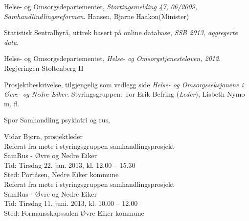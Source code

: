 \documentclass[11pt]{report} %
\begin{document}
              \begin{thebibliography}{99}

                  Helse- og Omsorgsdepartementet,
                  \emph{Stortingsmelding 47, 06/2009, Samhandlindlingsreformen}.
                  Hansen, Bjarne Haakon(Minister)

                  Statistisk Sentralbyrå, uttrek basert på online database,
                  \emph{SSB 2013, aggregerte data}.

                  Helse- og Omsorgsdepartementet,
                  \emph{Helse- og Omsorgstjenesteloven, 2012}.
                  Regjeringen Stoltenberg II

                  Prosjektbeskrivelse, tilgjengelig som vedlegg side \pageref{orig_pro_beskr}
                  \emph{Helse- og Omsorgsseksjonene i Øvre- og Nedre Eiker}.
                  Styringsgruppen: Tor Erik Befring (\emph{Leder}), Lisbeth Nymo m. fl.

                  Spor Samhandling psykiatri og rus,
                  Vidar Bjørn, prosjektleder \href{mailto:vibjoe@siv.no}{}\\

                  Referat fra møte i styringsgruppen samhandlingsprosjekt\\ 
                  SamRus - Øvre og Nedre Eiker\\
                  Tid: Tirsdag 22. jan. 2013,  kl. 12.00 – 15.30\\
                  Sted: Portåsen, Nedre Eiker kommune\\

                  Referat fra møte i styringsgruppen samhandlingsprosjekt\\ 
                  SamRus - Øvre og Nedre Eiker\\
                  Tid: Tirsdag 11. juni. 2013,  kl. 10.00 – 12.00\\
                  Sted: Formansskapssalen Øvre Eiker kommune\\


\end{thebibliography}
\end{document}
